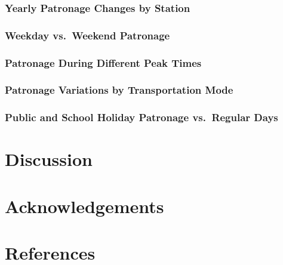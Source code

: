 \hypertarget{yearly-patronage-changes-by-station}{%
\subsubsection{Yearly Patronage Changes by Station}\label{yearly-patronage-changes-by-station}}

\hypertarget{weekday-vs.-weekend-patronage}{%
\subsubsection{Weekday vs.~Weekend Patronage}\label{weekday-vs.-weekend-patronage}}

\hypertarget{patronage-during-different-peak-times}{%
\subsubsection{Patronage During Different Peak Times}\label{patronage-during-different-peak-times}}

\hypertarget{patronage-variations-by-transportation-mode}{%
\subsubsection{Patronage Variations by Transportation Mode}\label{patronage-variations-by-transportation-mode}}

\hypertarget{public-and-school-holiday-patronage-vs.-regular-days}{%
\subsubsection{Public and School Holiday Patronage vs.~Regular Days}\label{public-and-school-holiday-patronage-vs.-regular-days}}

\hypertarget{discussion}{%
\section{Discussion}\label{discussion}}

\hypertarget{acknowledgements}{%
\section{Acknowledgements}\label{acknowledgements}}

\hypertarget{references}{%
\section*{References}\label{references}}

